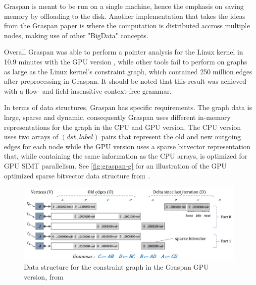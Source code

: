 Graspan is meant to be run on a single machine, hence the emphasis on saving memory by offloading to the disk. Another implementation that takes the ideas from the Graspan paper is \cite{gu2020towards} where the computation is distributed accross multiple nodes, making use of other "BigData" concepts.

Overall Graspan was able to perform a pointer analysis for the Linux kernel in 10.9 minutes with the GPU version \cite{zuo2021systemizing}, while other tools fail to perform on graphs as large as the Linux kernel's constraint graph, which contained 250 million edges after preprocessing in Graspan. It should be noted that this result was achieved with a flow- and field-insensitive context-free grammar.

In terms of data structures, Graspan has specific requirements. The graph data is large, sparse and dynamic, consequently Graspan uses different in-memory representations for the graph in the CPU and GPU version. The CPU version uses two arrays of $(dst,label)$ pairs that represent the old and new outgoing edges for each node while the GPU version uses a sparse bitvector representation that, while containing the same information as the CPU arrays, is optimized for GPU SIMT parallelism. See \autoref{fig:graspan-g} for an illustration of the GPU optimized sparse bitvector data structure from \cite{zuo2021systemizing}.

\begin{figure}
    \centering
    \includegraphics[width=1.\textwidth]{img/graspan-g.png}
    \caption[Graspan GPU Data Structure for the Constraint Graph]{Data structure for the constraint graph in the Graspan GPU version, from \cite{zuo2021systemizing}}
    \label{fig:graspan-g}
\end{figure}

